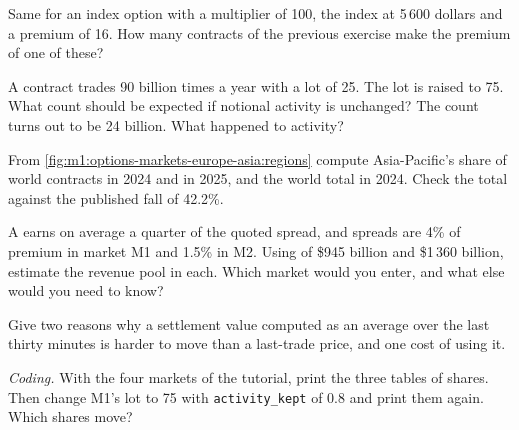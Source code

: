 \begin{exercise}[$\star$]\label{exo:m1:options-markets-europe-asia:2}
Same for an index option with a multiplier of 100, the index at 5\,600 dollars
and a premium of 16. How many contracts of the previous exercise make the
premium of one of these?
\end{exercise}

\begin{exercise}[$\star$]\label{exo:m1:options-markets-europe-asia:3}
A contract trades 90 billion times a year with a lot of 25. The lot is raised
to 75. What count should be expected if notional activity is unchanged? The
count turns out to be 24 billion. What happened to activity?
\end{exercise}

\begin{exercise}[$\star\star$]\label{exo:m1:options-markets-europe-asia:4}
From \cref{fig:m1:options-markets-europe-asia:regions} compute Asia-Pacific's
share of world contracts in 2024 and in 2025, and the world total in 2024.
Check the total against the published fall of 42.2\%.
\end{exercise}

\begin{exercise}[$\star\star$]\label{exo:m1:options-markets-europe-asia:5}
A  earns on average a quarter of the quoted spread, and spreads
are 4\% of premium in market M1 and 1.5\% in M2. Using  of
\$945 billion and \$1\,360 billion, estimate the revenue pool in each. Which
market would you enter, and what else would you need to know?
\end{exercise}

\begin{exercise}[$\star\star$]\label{exo:m1:options-markets-europe-asia:6}
Give two reasons why a settlement value computed as an average over the last
thirty minutes is harder to move than a last-trade price, and one cost of
using it.
\end{exercise}

\begin{exercise}[$\star\star\star$]\label{exo:m1:options-markets-europe-asia:7}
\emph{Coding.} With the four markets of the tutorial, print the three tables
of shares. Then change M1's lot to 75 with \texttt{activity\_kept} of 0.8 and
print them again. Which shares move?
\end{exercise}

